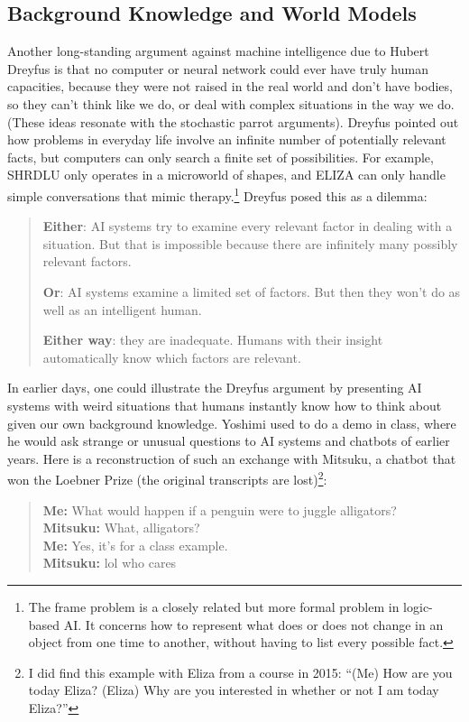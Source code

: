 \subsection{Background Knowledge and World Models}

Another long-standing argument against machine intelligence due to Hubert
Dreyfus \cite{dreyfus1992computers} is that no computer or neural network could
ever have truly human capacities, because they were not raised in the real
world and don't have bodies, so they can't think like we do, or deal with complex situations in the way we do. (These ideas resonate with the stochastic parrot arguments). Dreyfus pointed out how problems in everyday life involve an infinite number of potentially relevant facts, but computers can only search a finite set of possibilities. For example, SHRDLU only operates in a microworld of shapes, and ELIZA can only handle simple conversations that mimic therapy.\footnote{The frame problem is a closely related but more formal problem in logic-based AI. It concerns how to represent what does or does not change in an object from one time to another, without having to list every possible fact.} Dreyfus posed this as a dilemma:

\begin{quote}
\textbf{Either}: AI systems try to examine every relevant factor in dealing with a situation. But that is impossible because there are infinitely many possibly relevant factors.

\textbf{Or}: AI systems examine a limited set of factors. But then they won't do as well as an intelligent human.

\textbf{Either way}: they are inadequate. Humans with their insight automatically know which factors are relevant.
\end{quote}

In earlier days, one could illustrate the Dreyfus argument by presenting AI systems with weird situations that humans instantly know how to think about given our own background knowledge. Yoshimi used to do a demo in class, where he would ask strange or unusual questions to AI systems and chatbots of earlier years. Here is a reconstruction of such an exchange with Mitsuku, a chatbot that won the Loebner Prize \cite{wikiKuki2026} (the original transcripts are lost)\footnote{I did find this example with Eliza from a course in 2015: ``(Me) How are you today Eliza? (Eliza) Why are you interested in whether or not I am today Eliza?''}:

\begin{quote}
\textbf{Me:} What would happen if a penguin were to juggle alligators?\\
\textbf{Mitsuku:} What, alligators?\\
\textbf{Me:} Yes, it's for a class example.\\
\textbf{Mitsuku:} lol who cares
\end{quote}

